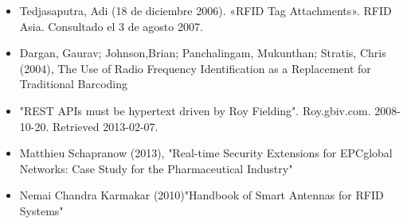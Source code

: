 \documentclass[11pt,twocolumn]{article}
\begin{document}
	\begin{itemize}
		\item  Tedjasaputra, Adi (18 de diciembre 2006). «RFID Tag Attachments». RFID 
		Asia. Consultado el 3 de agosto 2007.
		
		\item Dargan, Gaurav; Johnson,Brian; Panchalingam, Mukunthan; Stratis, 
		Chris (2004), The Use of Radio Frequency Identification as a Replacement for 
		Traditional Barcoding
		
		\item "REST APIs must be hypertext driven by Roy Fielding". Roy.gbiv.com. 
		2008-10-20. Retrieved 2013-02-07.
		
		\item Matthieu Schapranow (2013), "Real-time Security Extensions for EPCglobal
		 Networks: Case Study for the Pharmaceutical Industry"
		 
		 \item Nemai Chandra Karmakar (2010)"Handbook of Smart Antennas for RFID 
		 Systems"
		 
	\end{itemize}
	
\end{document}
